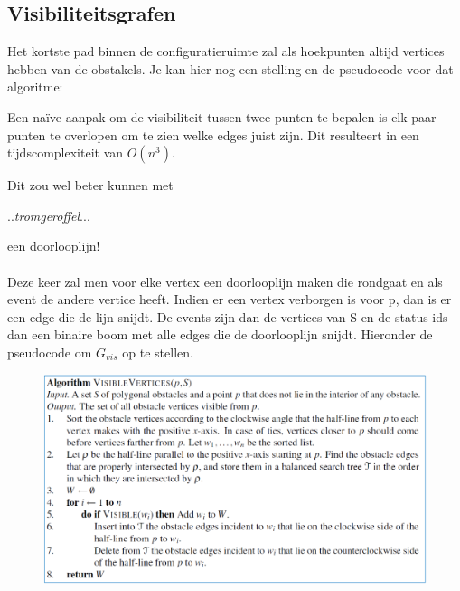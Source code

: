\documentclass[12pt,a4paper]{article}
\begin{document}
	
	\subsection{Visibiliteitsgrafen}
	Het kortste pad binnen de configuratieruimte zal als hoekpunten altijd vertices hebben van de obstakels. Je kan hier nog een stelling en de pseudocode voor dat algoritme: 
	\begin{figure}[H]
		\centering
		\label{fig:visibiliteitsgrafen-theorie}
	\end{figure}
	
	Een naïve aanpak om de visibiliteit tussen twee punten te bepalen is elk paar punten te overlopen om te zien welke edges juist zijn. Dit resulteert in een tijdscomplexiteit van $O(n^3)$. 
	
	Dit zou wel beter kunnen met 
	
	..\textit{tromgeroffel}...
	
	een doorlooplijn!
	\\
	\\
	Deze keer zal men voor elke vertex een doorlooplijn maken die rondgaat en als event de andere vertice heeft. Indien er een vertex verborgen is voor p, dan is er een edge die de lijn snijdt. De events zijn dan de vertices van S en de status ids dan een binaire boom met alle edges die de doorlooplijn snijdt. Hieronder de pseudocode om $G_{vis}$ op te stellen. 
	\begin{figure}[H]
		\centering
		\includegraphics[width=0.7\linewidth]{afbeeldingen/Motion-plannine/visibleVertices}
		\label{fig:visiblevertices}
	\end{figure}
	
\end{document}
